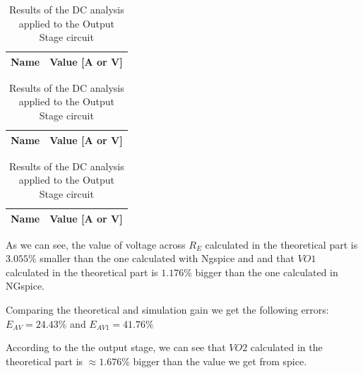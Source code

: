 \begin{table}
    \parbox{.45\linewidth}{
        \centering
        \begin{tabular}{|c|c|}
            \hline
            {\bf Name} & {\bf Value [A or V]} \\ \hline
            
        \end{tabular}
        \label{tab:GainStage_OP}
        \caption{Results of the DC analysis applied to the Gain Stage circuit}
    }
    \hfill
    \parbox{.45\linewidth}{
        \centering
        \begin{tabular}{|c|c|}
            {\bf Name} & {\bf Value [A or V]} \\ \hline
            
            \hline
        \end{tabular}
        \label{tab:Spice_OP}
        \caption{Results of the OP analysis applied to the whole circuit by using the Ngspice}
    }
    \hfill
    \parbox{.45\linewidth}{
        \centering
        \begin{tabular}{|c|c|}
            {\bf Name} & {\bf Value [A or V]} \\ \hline
            
            \hline
        \end{tabular}
        \label{tab:OutputStage_OP}
        \caption{Results of the DC analysis applied to the Output Stage circuit }
    }
\end{table}

As we can see, the value of voltage across $R_E$ calculated in the 
theoretical part is $3.055\%$ smaller than the one calculated with 
Ngspice and and that $VO1$ calculated in the theoretical part is 
$1.176\%$ bigger than the one calculated in NGspice.

Comparing the theoretical and simulation gain we get the following errors:
$E_{AV} = 24.43\%$ and $E_{AV1} = 41.76\%$

According to the the output stage, we can see that $VO2$ calculated 
in the theoretical part is $\approx 1.676\%$ bigger than the value 
we get from spice.

